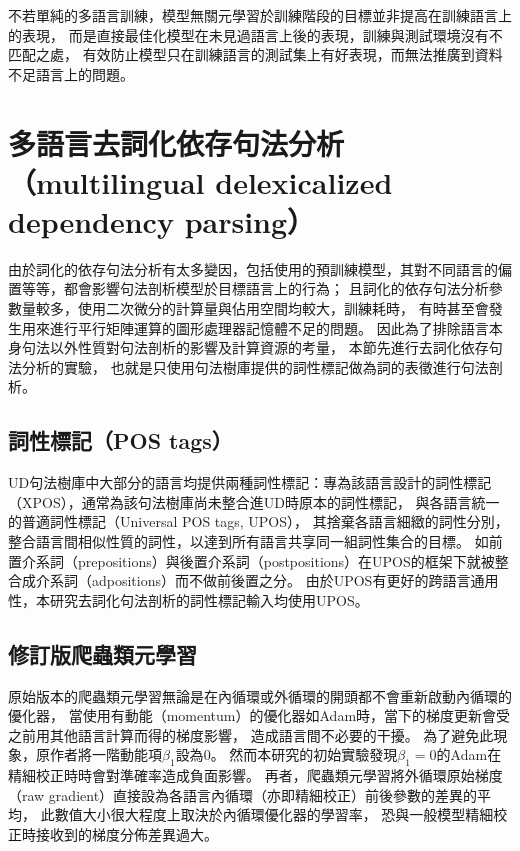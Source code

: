 不若單純的多語言訓練，模型無關元學習於訓練階段的目標並非提高在訓練語言上的表現，
而是直接最佳化模型在未見過語言上\finetune 後的表現，訓練與測試環境沒有不匹配之處，
有效防止模型只在訓練語言的測試集上有好表現，而無法推廣到資料不足語言上的問題。

\iffalse
尤其當目標任務缺乏資料的時候，若使用過於有表現力的假說集合，
易使模型過擬合到目標任務上，
利用相似任務進行多工學習幫助目標任務提升表現的效果尤其顯著。
然而多工學習得到的模型可以在訓練過的所有任務上的測試集有好表現，
但並未保證這樣的好表現可以轉移到相似但未見過的任務上；
而芬氏(Chelsea Finn)提出的模型無關元學習(model-agnostic meta-learning)
\cite{Finn2017ModelAgnosticMF}提供了多工學習之外的另一種方法，
將領域的歸納偏置（inductive bias）注入類神經網路中。
\fi



\section{多語言去詞化依存句法分析（multilingual delexicalized dependency parsing）}
由於詞化的依存句法分析有太多變因，包括使用的預訓練模型，其對不同語言的偏置等等，都會影響句法剖析模型於目標語言上的行為；
且詞化的依存句法分析參數量較多，使用二次微分的計算量與佔用空間均較大，訓練耗時，
有時甚至會發生用來進行平行矩陣運算的圖形處理器記憶體不足的問題。
因此為了排除語言本身句法以外性質對句法剖析的影響及計算資源的考量，
本節先進行去詞化依存句法分析的實驗，
也就是只使用句法樹庫提供的詞性標記做為詞的表徵進行句法剖析。

\subsection{詞性標記（POS tags）}
UD句法樹庫中大部分的語言均提供兩種詞性標記：專為該語言設計的詞性標記（XPOS），通常為該句法樹庫尚未整合進UD時原本的詞性標記，
與各語言統一的普適詞性標記\cite{petrov-etal-2012-universal}（Universal POS tags, UPOS），
其捨棄各語言細緻的詞性分別，
整合語言間相似性質的詞性，以達到所有語言共享同一組詞性集合的目標。
如前置介系詞（prepositions）與後置介系詞（postpositions）在UPOS的框架下就被整合成介系詞（adpositions）而不做前後置之分。
由於UPOS有更好的跨語言通用性，本研究去詞化句法剖析的詞性標記輸入均使用UPOS。

\subsection{修訂版爬蟲類元學習}
原始版本的爬蟲類元學習\cite{nichol2018first}無論是在內循環或外循環的開頭都不會重新啟動內循環的優化器，
當使用有動能（momentum）的優化器如Adam時，當下的梯度更新會受之前用其他語言計算而得的梯度影響，
造成語言間不必要的干擾。
為了避免此現象，原作者將一階動能項$\beta_{1}$設為$0$。
然而本研究的初始實驗發現$\beta_{1} = 0$的Adam在精細校正時時會對準確率造成負面影響。
再者，爬蟲類元學習將外循環原始梯度（raw gradient）直接設為各語言內循環（亦即精細校正）前後參數的差異的平均，
此數值大小很大程度上取決於內循環優化器的學習率，
恐與一般模型精細校正時接收到的梯度分佈差異過大。

